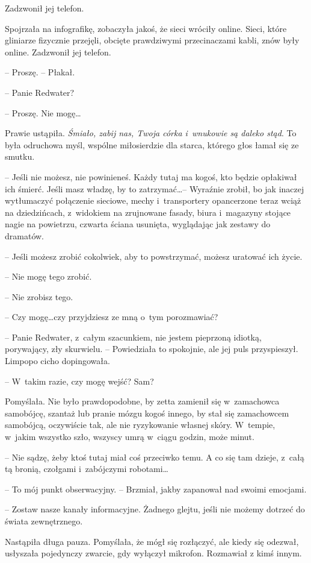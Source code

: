 \documentclass[oneside,polish,11pt,sfheadings]{mwbk}
\begin{document}
Zadzwonił jej telefon.

Spojrzała na infografikę, zobaczyła jakoś, że sieci wróciły online.
Sieci, które gliniarze fizycznie przejęli, obcięte prawdziwymi
przecinaczami kabli, znów były online. Zadzwonił jej telefon.

-- Proszę. -- Płakał.

-- Panie Redwater?

-- Proszę. Nie mogę\ldots 

Prawie ustąpiła. \textit{Śmiało, zabij nas, Twoja córka i~wnukowie są
daleko stąd}. To była odruchowa myśl, wspólne miłosierdzie dla starca,
którego głos łamał się ze smutku.

-- Jeśli nie możesz, nie powinieneś. Każdy tutaj ma kogoś, kto będzie
opłakiwał ich śmierć. Jeśli masz władzę, by to zatrzymać\ldots  -- Wyraźnie
zrobił, bo jak inaczej wytłumaczyć połączenie sieciowe, mechy i~transportery opancerzone teraz wciąż na dziedzińcach, z~widokiem na
zrujnowane fasady, biura i~magazyny stojące nagie na powietrzu, czwarta
ściana usunięta, wyglądając jak zestawy do dramatów. 

-- Jeśli możesz
zrobić cokolwiek, aby to powstrzymać, możesz uratować ich życie.

-- Nie mogę tego zrobić.

-- Nie zrobisz tego.

-- Czy mogę\ldots  czy przyjdziesz ze mną o~tym porozmawiać?

-- Panie Redwater, z~całym szacunkiem, nie jestem pieprzoną idiotką,
porywający, zły skurwielu. -- Powiedziała to spokojnie, ale jej puls
przyspieszył. Limpopo cicho dopingowała.

-- W~takim razie, czy mogę wejść? Sam?

Pomyślała. Nie było prawdopodobne, by zetta zamienił się w~zamachowca
samobójcę, szantaż lub pranie mózgu kogoś innego, by stał się
zamachowcem samobójcą, oczywiście tak, ale nie ryzykowanie własnej
skóry. W~tempie, w~jakim wszystko szło, wszyscy umrą w~ciągu godzin,
może minut.

-- Nie sądzę, żeby ktoś tutaj miał coś przeciwko temu. A co się tam
dzieje, z~całą tą bronią, czołgami i~zabójczymi robotami\ldots 

-- To mój punkt obserwacyjny. -- Brzmiał, jakby zapanował nad swoimi
emocjami.

-- Zostaw nasze kanały informacyjne. Żadnego glejtu, jeśli nie możemy
dotrzeć do świata zewnętrznego.

Nastąpiła długa pauza. Pomyślała, że mógł się rozłączyć, ale kiedy się
odezwał, usłyszała pojedynczy zwarcie, gdy wyłączył mikrofon. Rozmawiał
z kimś innym.
\end{document}
